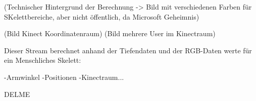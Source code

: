 (Technischer Hintergrund der Berechnung -> Bild mit verschiedenen Farben für SKelettbereiche, aber nicht öffentlich, da Microsoft Geheimnis)

(Bild Kinect Koordinatenraum)
(Bild mehrere User im Kinectraum)




Dieser Stream berechnet anhand der Tiefendaten und der RGB-Daten werte für ein Menschliches Skelett:

-Armwinkel
-Positionen
-Kinectraum...


DELME\cite{hertzberg2009mobile}

